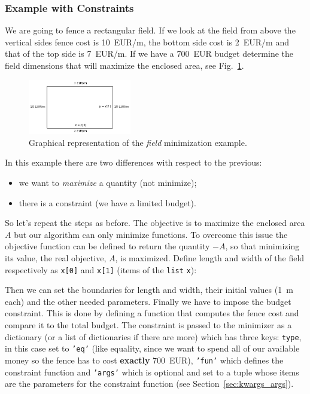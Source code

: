 \subsubsection{Example with Constraints}
\label{example-with-constraint}

We are going to fence a rectangular field. If we look at the field from above the vertical sides fence cost is 10~EUR/m, the bottom side cost is 2~EUR/m and that of the top side is 7~EUR/m. If we have a 700~EUR budget determine
the field dimensions that will maximize the enclosed area, see Fig.~\ref{fig:field}.

\begin{figure}[ht]
\centering
\includegraphics[width=0.4\textwidth]{figures/field.png}
\caption{Graphical representation of the \emph{field} minimization example.}
\label{fig:field}
\end{figure}

In this example there are two differences with respect to the previous:

\begin{itemize}
\tightlist
\item we want to \emph{maximize} a quantity (not minimize);
\item there is a constraint (we have a limited budget).
\end{itemize}


So let's repeat the steps as before. The objective is to maximize the enclosed area $A$ but our algorithm can only minimize functions. To overcome this issue the objective function can be defined to return the quantity $-A$, so that minimizing its value, the real objective, $A$, is maximized. 
Define length and width of the field respectively as \texttt{x[0]} and \texttt{x[1]} (items of the \texttt{list} \texttt{x}):

Then we can set the boundaries for length and width, their initial values (1~m each) and the other needed parameters.
Finally we have to impose the budget constraint. This is done by defining a function that computes the fence cost and compare it to the total budget. 
The constraint is passed to the minimizer as a dictionary (or a list  of dictionaries if there are more) which has three keys: \texttt{type}, in this case set to \texttt{'eq'} (like equality, since we want to spend all of our available money so the fence has to cost \textbf{exactly} 700~EUR), \texttt{'fun'} which defines the constraint function and \texttt{'args'} which is optional and set to a tuple whose items are the parameters for the constraint function (see Section~\ref{sec:kwargs_args}).

